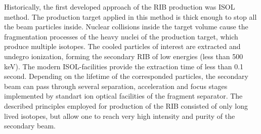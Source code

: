 Historically, the first developed approach of the RIB production was ISOL method. 
The production target applied in this method is thick enough to stop all the beam particles inside.
Nuclear collisions inside the target volume cause the fragmentation processes of the heavy nuclei of the production target, which produce multiple isotopes.
The cooled particles of interest are extracted and undegro ionization, forming the secondary RIB of low energies (less than 500 keV).
The modern ISOL-facilities provide the extraction time of less than 0.1 second.
Depending on the lifetime of the corresponded particles, the secondary beam can pass through several separation, acceleration and focus stages implemented by standart ion optical facilities of the fragment separator.	
The described principles employed for production of the RIB consisted of only long lived isotopes, but allow one to reach very high intensity and purity of the secondary beam.

